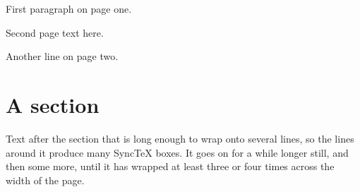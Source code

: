 \documentclass{article}
\begin{document}
First paragraph on page one.

\newpage
Second page text here.

Another line on page two.
\section{A section}
Text after the section that is long enough to wrap onto several lines, so the lines around it produce many SyncTeX boxes. It goes on for a while longer still, and then some more, until it has wrapped at least three or four times across the width of the page.
\end{document}
